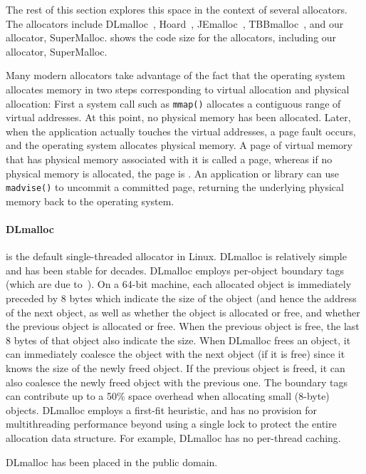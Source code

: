 \documentclass[pldi]{sigplanconf-pldi15}
\newcommand{\code}[1]{\texttt{#1}}
\begin{document}
The rest of this section explores this space in the context of several
allocators.  The allocators include DLmalloc~\cite{Lea96},
Hoard~\cite{BergerMcBl00}, JEmalloc~\cite{Evans06},
TBBmalloc~\cite{KukanovVo07}, and our allocator, SuperMalloc.
 shows the code size for the allocators, including
our allocator, SuperMalloc.

Many modern allocators take advantage of the fact that the operating
system allocates memory in two steps corresponding to virtual
allocation and physical allocation: First a system call such as
\code{mmap()} allocates a contiguous range of virtual addresses.  At
this point, no physical memory has been allocated.  Later, when the
application actually touches the virtual addresses, a page fault
occurs, and the operating system allocates physical memory.  A page of
virtual memory that has physical memory associated with it is called a
 page, whereas if no physical memory is allocated, the
page is .  An application or library can use
\code{madvise()} to uncommit a committed page, returning the
underlying physical memory back to the operating system.

{\paragraph{DLmalloc}} \cite{Lea96} is the default single-threaded
allocator in Linux.  DLmalloc is relatively simple and has been stable
for decades.  DLmalloc employs per-object boundary tags (which are due
to~\cite{Knuth73}).  On a 64-bit machine, each allocated object is
immediately preceded by 8 bytes which indicate the size of the object
(and hence the address of the next object, as well as whether the
object is allocated or free, and whether the previous object is
allocated or free.  When the previous object is free, the last 8 bytes
of that object also indicate the size.  When DLmalloc frees an object,
it can immediately coalesce the object with the next object (if it is
free) since it knows the size of the newly freed object.  If the
previous object is freed, it can also coalesce the newly freed object
with the previous one.  The boundary tags can contribute up to a 50\%
space overhead when allocating small (8-byte) objects.  DLmalloc
employs a first-fit heuristic, and has no provision for multithreading
performance beyond using a single lock to protect the entire
allocation data structure.  For example, DLmalloc has no per-thread
caching.

DLmalloc has been placed in the public domain.
\end{document}
